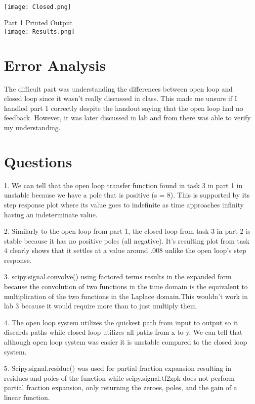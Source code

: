 \documentclass[12pt]{report}
\begin{document}
\\ \texttt{[image: Closed.png]}

Part 1 Printed Output
\\ \texttt{[image: Results.png]}



\section{Error Analysis}

The difficult part was understanding the differences between open loop and closed loop since it wasn't really discussed in class. This made me unsure if I handled part 1 correctly despite the handout saying that the open loop had no feedback. However, it was later discussed in lab and from there was able to verify my understanding. 

\section{Questions}
1. We can tell that the open loop transfer function found in task 3 in part 1 in unstable because we have a pole that is positive (s = 8). This is supported by its step response plot where its value goes to indefinite as time approaches infinity having an indeterminate value.

2. Similarly to the open loop from part 1, the closed loop from task 3 in part 2 is stable because it has no positive poles (all negative). It's resulting plot from task 4 clearly shows that it settles at a value around .008 unlike the open loop's step response. 

3. scipy.signal.convolve() using factored terms results in the expanded form because the convolution of two functions in the time domain is the equivalent to multiplication of the two functions in the Laplace domain.This wouldn't work in lab 3 because it would require more than to just multiply them. 

4. The open loop system utilizes the quickest path from input to output so it discards paths while closed loop utilizes all paths from x to y. We can tell that although open loop system was easier it is unstable compared to the closed loop system. 

5. Scipy.signal.residue() was used for partial fraction expansion resulting in residues and poles of the function while scipy.signal.tf2zpk does not perform partial fraction expansion, only returning the zeroes, poles, and the gain of a linear function.
\end{document}
